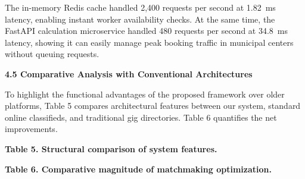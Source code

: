 \documentclass[10pt,twocolumn,a4paper]{article}
\begin{document}
\vspace{0.3em}
The in-memory Redis cache handled 2,400 requests per second at 1.82~ms latency, enabling instant worker availability checks. At the same time, the FastAPI calculation microservice handled 480 requests per second at 34.8~ms latency, showing it can easily manage peak booking traffic in municipal centers without queuing requests.

\vspace{0.3em}
\noindent
\textbf{4.5 Comparative Analysis with Conventional Architectures}

To highlight the functional advantages of the proposed framework over older platforms, Table 5 compares architectural features between our system, standard online classifieds, and traditional gig directories. Table 6 quantifies the net improvements.

\vspace{0.3em}
\noindent
\textbf{Table 5. Structural comparison of system features.}
\vspace{0.2em}

\noindent
{}

\vspace{0.3em}
\noindent
\textbf{Table 6. Comparative magnitude of matchmaking optimization.}
\vspace{0.2em}

\noindent
{}
\end{document}
